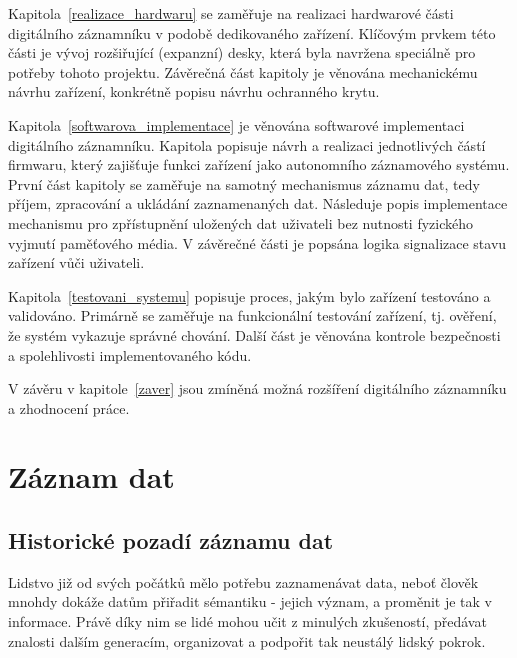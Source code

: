Kapitola~\ref{realizace_hardwaru} se zaměřuje na realizaci hardwarové části digitálního záznamníku v podobě dedikovaného zařízení. Klíčovým prvkem této části je vývoj rozšiřující (expanzní) desky, která byla navržena speciálně pro potřeby tohoto projektu. Závěrečná část kapitoly je věnována mechanickému návrhu zařízení, konkrétně popisu návrhu ochranného krytu.

Kapitola~\ref{softwarova_implementace} je věnována softwarové implementaci digitálního záznamníku. Kapitola popisuje návrh a realizaci jednotlivých částí firmwaru, který zajišťuje funkci zařízení jako autonomního záznamového systému. První část kapitoly se zaměřuje na samotný mechanismus záznamu dat, tedy příjem, zpracování a ukládání zaznamenaných dat. Následuje popis implementace mechanismu pro zpřístupnění uložených dat uživateli bez nutnosti fyzického vyjmutí paměťového média. V závěrečné části je popsána logika signalizace stavu zařízení vůči uživateli.

Kapitola~\ref{testovani_systemu} popisuje proces, jakým bylo zařízení testováno a validováno. Primárně se zaměřuje na funkcionální testování zařízení, tj. ověření, že systém vykazuje správné chování. Další část je věnována kontrole bezpečnosti a spolehlivosti implementovaného kódu.

V závěru v kapitole~\ref{zaver} jsou zmíněná možná rozšíření digitálního záznamníku a zhodnocení práce.

\chapter{Záznam dat}
\label{zaznam_dat}

\section{Historické pozadí záznamu dat}
\label{pocatky}
Lidstvo již od svých počátků mělo potřebu zaznamenávat data, neboť člověk mnohdy dokáže datům přiřadit sémantiku - jejich význam, a proměnit je tak v informace. Právě díky nim se lidé mohou učit z minulých zkušeností, předávat znalosti dalším generacím, organizovat a podpořit tak neustálý lidský pokrok. 

